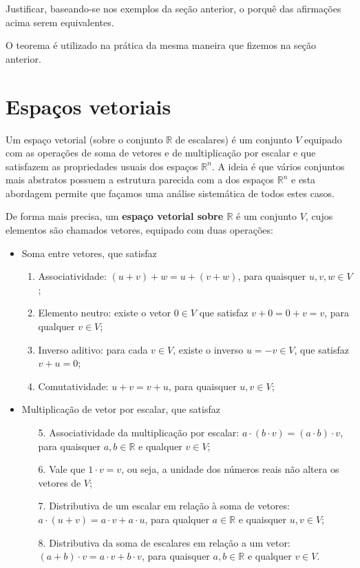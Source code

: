 \documentclass[../livro.tex]{subfiles}  %
\begin{document}
\begin{exercise}
	Justificar, baseando-se nos exemplos da seção anterior, o porquê das afirmações acima serem equivalentes.
\end{exercise}

O teorema é utilizado na prática da mesma maneira que fizemos na seção anterior.




\section{Espaços vetoriais}


Um espaço vetorial (sobre o conjunto $\mathbb{R}$ de escalares) é um conjunto $V$ equipado com as operações de soma de vetores e de multiplicação por escalar e que satisfazem as propriedades usuais dos espaços $\mathbb{R}^n$. A ideia é que vários conjuntos mais abstratos possuem a estrutura parecida com a dos espaços $\mathbb{R}^n$ e esta abordagem permite que façamos uma análise sistemática de todos estes casos.

De forma mais precisa, um \textbf{espaço vetorial sobre $\mathbb{R}$} é um conjunto $V$, cujos elementos são chamados vetores, equipado com duas operações:
\begin{itemize}
	\item Soma entre vetores, que satisfaz
	\begin{enumerate}
		\item Associatividade: $(u+v)+w=u+(v+w)$, para quaisquer $u,v,w \in V$;
		\item Elemento neutro: existe o vetor $0 \in V$ que satisfaz $v+0=0+v=v$, para qualquer $v \in V$;
		\item Inverso aditivo: para cada $v \in V$, existe o inverso $u= -v \in V$, que satisfaz $v+u=0$;
		\item Comutatividade: $u+v = v+u$, para quaisquer $u, v \in V$;
	\end{enumerate}
	\item Multiplicação de vetor por escalar, que satisfaz
	\begin{enumerate}
		\item[5.] Associatividade da multiplicação por escalar: $a\cdot (b\cdot v)=(a\cdot b)\cdot v$, para quaisquer $a,b \in \mathbb{R}$ e qualquer $v \in V$;
		\item[6.] Vale que $1 \cdot v = v$, ou seja, a unidade dos números reais não altera os vetores de $V$;
		\item[7.] Distributiva de um escalar em relação à soma de vetores: $a \cdot (u+v) = a\cdot v+a\cdot u$, para qualquer $a \in \mathbb{R}$ e quaisquer $u,v \in V$;
		\item[8.] Distributiva da soma de escalares em relação a um vetor: $(a+b) \cdot v = a \cdot v+b \cdot v$, para quaisquer $a,b \in \mathbb{R}$ e qualquer $v \in V$.
	\end{enumerate}
\end{itemize}
\end{document}
